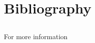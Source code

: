 \documentclass[12pt,ignorenonframetext,aspectratio=169]{beamer}
\begin{document}
\hypertarget{bibliography}{%
\section{Bibliography}\label{bibliography}}

\hypertarget{section-10}{%
\subsection{}\label{section-10}}

\begin{frame}{For more information}
\protect\hypertarget{for-more-information}{}

\end{frame}
\end{document}

